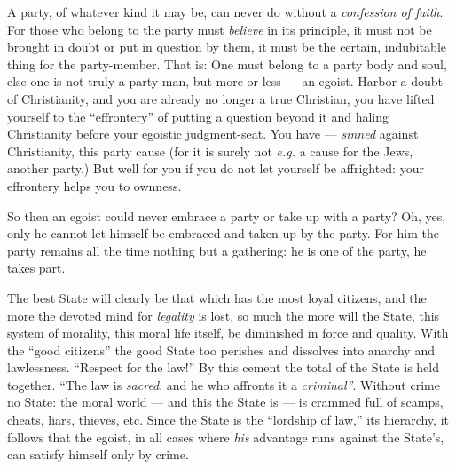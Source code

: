 A party, of whatever kind it may be, can never do without a \textit{confession 
of faith}. For those who belong to the party must \textit{believe} in its 
principle, it must not be brought in doubt or put in question by them, it must 
be the certain, indubitable thing for the party-member. That is: One must 
belong to a party body and soul, else one is not truly a party-man, but more 
or less --- an egoist. Harbor a doubt of Christianity, and you are already no 
longer a true Christian, you have lifted yourself to the ``effrontery'' of 
putting a question beyond it and haling Christianity before your egoistic 
judgment-seat. You have --- \textit{sinned} against Christianity, this party 
cause (for it is surely not \textit{e.g.} a cause for the Jews, another 
party.) But well for you if you do not let yourself be affrighted: your 
effrontery helps you to ownness.

So then an egoist could never embrace a party or take up with a party? Oh, 
yes, only he cannot let himself be embraced and taken up by the party. For him 
the party remains all the time nothing but a gathering: he is one of the 
party, he takes part.

\myhrule


The best State will clearly be that which has the most loyal citizens, and the 
more the devoted mind for \textit{legality} is lost, so much the more will the 
State, this system of morality, this moral life itself, be diminished in force 
and quality. With the ``good citizens'' the good State too perishes and 
dissolves into anarchy and lawlessness. ``Respect for the law!'' By this 
cement the total of the State is held together. ``The law is \textit{sacred}, 
and he who affronts it a \textit{criminal''}. Without crime no State: the 
moral world --- and this the State is --- is crammed full of scamps, cheats, 
liars, thieves, etc. Since the State is the ``lordship of law,'' its 
hierarchy, it follows that the egoist, in all cases where \textit{his} 
advantage runs against the State's, can satisfy himself only by crime.

